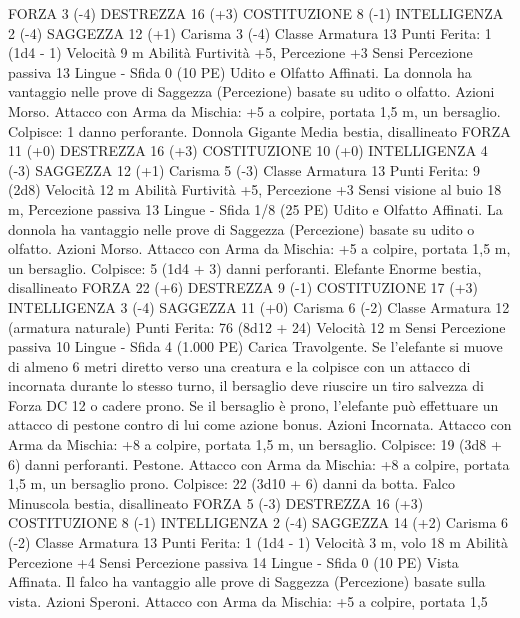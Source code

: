 \begin{multicols}{2}
FORZA 3 (-4)
DESTREZZA 16 (+3)
COSTITUZIONE 8 (-1)
INTELLIGENZA 2 (-4)
SAGGEZZA 12 (+1)
Carisma 3 (-4)
Classe Armatura 13
\hspace*{0pt}\hfill{Punti Ferita}: 1 (1d4 - 1)
Velocità 9 m
Abilità Furtività +5, Percezione +3
Sensi Percezione passiva 13
Lingue -
Sfida 0 (10 PE)
Udito e Olfatto Affinati. La donnola ha vantaggio nelle prove di
Saggezza (Percezione) basate su udito o olfatto.
Azioni
Morso. Attacco con Arma da Mischia: +5 a colpire, portata 1,5
m, un bersaglio.
Colpisce: 1 danno perforante.
Donnola Gigante
Media bestia, disallineato
FORZA 11 (+0)
DESTREZZA 16 (+3)
COSTITUZIONE 10 (+0)
INTELLIGENZA 4 (-3)
SAGGEZZA 12 (+1)
Carisma 5 (-3)
Classe Armatura 13
\hspace*{0pt}\hfill{Punti Ferita}: 9 (2d8)
Velocità 12 m
Abilità Furtività +5, Percezione +3
Sensi visione al buio 18 m, Percezione passiva 13
Lingue -
Sfida 1/8 (25 PE)
Udito e Olfatto Affinati. La donnola ha vantaggio nelle prove di
Saggezza (Percezione) basate su udito o olfatto.
Azioni
Morso. Attacco con Arma da Mischia: +5 a colpire, portata 1,5
m, un bersaglio.
Colpisce: 5 (1d4 + 3) danni perforanti.
Elefante
Enorme bestia, disallineato
FORZA 22 (+6)
DESTREZZA 9 (-1)
COSTITUZIONE 17 (+3)
INTELLIGENZA 3 (-4)
SAGGEZZA 11 (+0)
Carisma 6 (-2)
Classe Armatura 12 (armatura naturale)
\hspace*{0pt}\hfill{Punti Ferita}: 76 (8d12 + 24)
Velocità 12 m
Sensi Percezione passiva 10
Lingue -
Sfida 4 (1.000 PE)
Carica Travolgente. Se l’elefante si muove di almeno 6 metri
diretto verso una creatura e la colpisce con un attacco di
incornata durante lo stesso turno, il bersaglio deve riuscire un
tiro salvezza di Forza DC 12 o cadere prono. Se il bersaglio è
prono, l’elefante può effettuare un attacco di pestone contro di
lui come azione bonus.
Azioni
Incornata. Attacco con Arma da Mischia: +8 a colpire, portata
1,5 m, un bersaglio.
Colpisce: 19 (3d8 + 6) danni perforanti.
Pestone. Attacco con Arma da Mischia: +8 a colpire, portata 1,5
m, un bersaglio prono.
Colpisce: 22 (3d10 + 6) danni da botta.
Falco
Minuscola bestia, disallineato
FORZA 5 (-3)
DESTREZZA 16 (+3)
COSTITUZIONE 8 (-1)
INTELLIGENZA 2 (-4)
SAGGEZZA 14 (+2)
Carisma 6 (-2)
Classe Armatura 13
\hspace*{0pt}\hfill{Punti Ferita}: 1 (1d4 - 1)
Velocità 3 m, volo 18 m
Abilità Percezione +4
Sensi Percezione passiva 14
Lingue -
Sfida 0 (10 PE)
Vista Affinata. Il falco ha vantaggio alle prove di Saggezza
(Percezione) basate sulla vista.
Azioni
Speroni. Attacco con Arma da Mischia: +5 a colpire, portata 1,5

\end{multicols}
